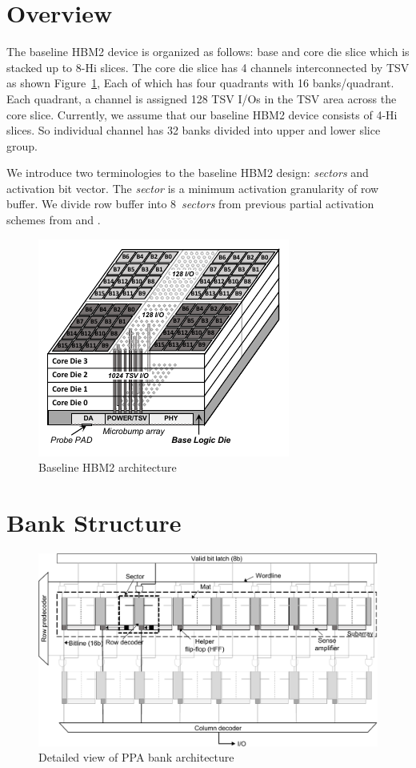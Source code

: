 \section{Overview}

The baseline HBM2 device is organized as follows: 
base and core die slice which is stacked up to 8-Hi slices. 
The core die slice has 4 channels interconnected by TSV as shown Figure~\ref{fig:ch3:basearch}, 
Each of which has four quadrants with 16 banks/quadrant. 
Each quadrant, a channel is assigned 128 TSV I/Os in the TSV area across the core slice. 
Currently, we assume that our baseline HBM2 device consists of 4-Hi slices. 
So individual channel has 32 banks divided into upper and lower slice group.

We introduce two terminologies to the baseline HBM2 design: \textit{sectors} and activation bit vector. 
The \textit{sector} is a minimum activation granularity of row buffer. 
We divide row buffer into 8~\textit{sectors} from previous partial activation schemes from  and .

\begin{figure}[th]
    \centering
        \includegraphics[page=1,width=0.5\linewidth]{figure/baseline_HBM2.pdf}
    \caption[Baseline HBM2 architecture]{Baseline HBM2 architecture\footnotemark{}}
    \label{fig:ch3:basearch}
\end{figure}

\section{Bank Structure}

\begin{figure}[th]
    \centering
        \includegraphics[width=\linewidth]{figure/bank_structure_vfin.pdf}
    \caption{Detailed view of PPA bank architecture}
    \label{fig:ch3:bankstruct}
\end{figure}

